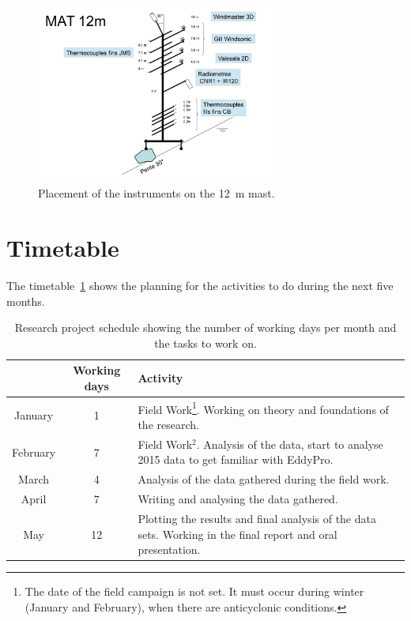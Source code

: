 \begin{figure}[!ht]
  \begin{center}
  \includegraphics[width=0.7\textwidth]{fig/0002.jpg}
  \caption{Placement of the instruments on the 12~m mast.}
  \label{fig:mast_12}
  \end{center}
\end{figure}

\section{Timetable}
The timetable~\ref{table:schedule} shows the planning for the activities to do during the next five months. 

\begin{table}[ht!]
\begin{center}
\begin{tabular}{|c|c|p{9.5cm}|}
\hline
  & \textbf{Working days} & \textbf{Activity} \\
\hline
January & 1 & Field Work\footnote{\label{note1}The date of the field campaign is not set. It must occur during winter (January and February), when there are anticyclonic conditions.}. Working on theory and foundations of the research.\\
\hline
February & 7 & Field Work$^2$. Analysis of the data, start to analyse 2015 data to get familiar with EddyPro.\\
\hline
March & 4 & Analysis of the data gathered during the field work.\\
\hline
April & 7 & Writing and analysing the data gathered.\\
\hline
May & 12 & Plotting the results and final analysis of the data sets. Working in the final report and oral presentation.\\
\hline
\end{tabular}
\caption{Research project schedule showing the number of working days per month and the tasks to work on.}
\label{table:schedule}
\end{center}
\end{table}